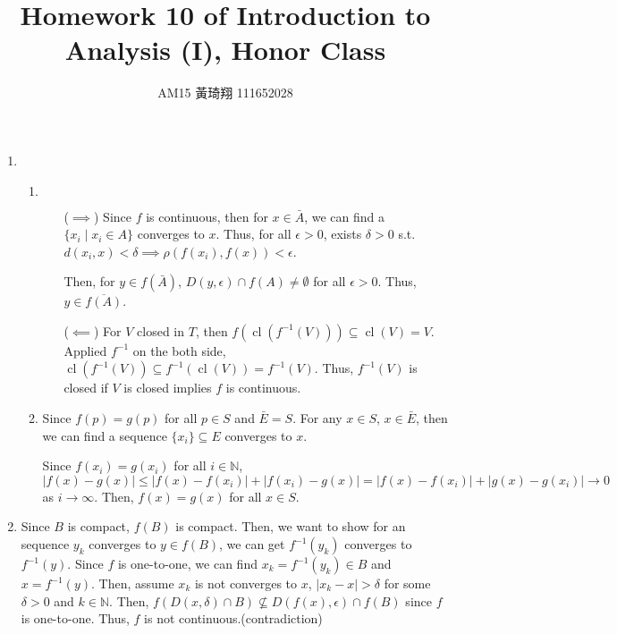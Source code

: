 \documentclass[12pt]{article}
\title{Homework 10 of Introduction to Analysis (I), Honor Class}
\author{AM15 黃琦翔 111652028}
\DeclareMathOperator{\closure}{cl}
\begin{document}
\maketitle
\begin{enumerate}
    \item \begin{enumerate}
        \item $\ $
        \begin{enumerate}
            \item[($\implies$)] Since $f$ is continuous, then for $x\in \bar{A}$, 
            we can find a $\lbrace x_i\mid x_i\in A\rbrace$ converges to $x$.
            Thus, for all $\epsilon > 0$, exists $\delta > 0$ s.t. $d(x_i, x) < \delta \implies \rho(f(x_i), f(x)) < \epsilon$.

            Then, for $y \in f(\bar{A})$, $D(y, \epsilon)\cap f(A) \neq \emptyset$ for all $\epsilon > 0$.
            Thus, $y \in \overline{f(A)}$.
            
            \item[($\impliedby$)] For $V$ closed in $T$, then $f(\closure(f^{-1}(V))) \subseteq \closure(V) = V$.
            Applied $f^{-1}$ on the both side, $\closure(f^{-1}(V)) \subseteq f^{-1}(\closure(V)) = f^{-1}(V)$.
            Thus, $f^{-1}(V)$ is closed if $V$ is closed implies $f$ is continuous.           

        \end{enumerate}

        \item Since $f(p) = g(p)$ for all $p \in S$ and $\bar{E} = S$.
        For any $x\in S$, $x\in \bar{E}$, then we can find a sequence $\lbrace x_i\rbrace\subseteq E$ converges to $x$.

        Since $f(x_i) = g(x_i)$ for all $i\in \mathbb{N}$, $|f(x) - g(x)| \leq |f(x) - f(x_i)| + |f(x_i) - g(x)| = |f(x) - f(x_i)| + |g(x)- g(x_i)| \to 0$ as $i\to \infty$.
        Then, $f(x) = g(x)$ for all $x\in S$.
    \end{enumerate}

    \item Since $B$ is compact, $f(B)$ is compact.
    Then, we want to show for an sequence $y_k$ converges to $y\in f(B)$,
    we can get $f^{-1}(y_k)$ converges to $f^{-1}(y)$.
    Since $f$ is one-to-one, we can find $x_k = f^{-1}(y_k)\in B$ and $x = f^{-1}(y)$.
    Then, assume $x_k$ is not converges to $x$, 
    $|x_k -x| > \delta$ for some $\delta > 0$ and $k\in \mathbb{N}$.
    Then, $f(D(x, \delta)\cap B) \not\subseteq D(f(x), \epsilon)\cap f(B)$ since $f$ is one-to-one.
    Thus, $f$ is not continuous.(contradiction)


\end{enumerate}
\end{document}
